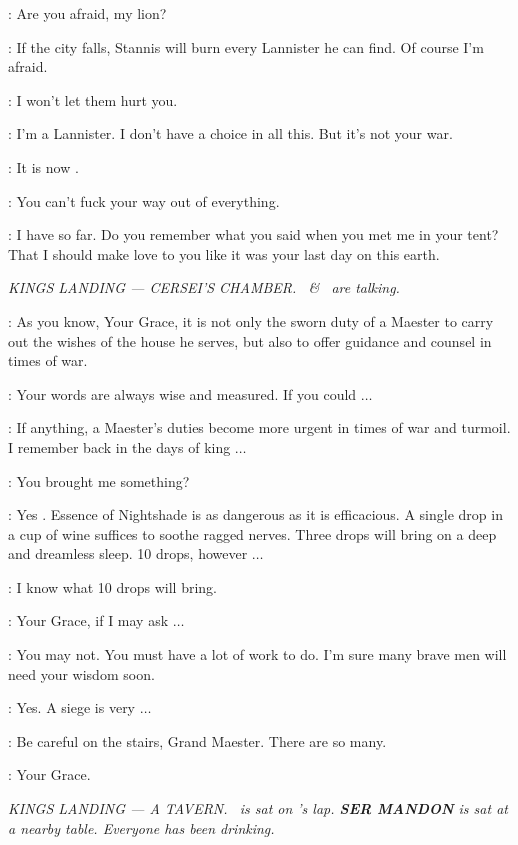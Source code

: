 \SHAE: Are you afraid, my lion? 

\TYRION: If the city falls, Stannis will burn every Lannister he can find. 
Of course I'm afraid. 

\SHAE: I won't let them hurt you. 

\TYRION: I'm a Lannister. 
I don't have a choice in all this. 
But it's not your war. 

\SHAE: It is now . 

\TYRION: You can't fuck your way out of everything. 

\SHAE: I have so far. 
Do you remember what you said when you met me in your tent? 
That I should make love to you like it was your last day on this
earth. 


\scene

\textit{KINGS LANDING --- CERSEI'S CHAMBER. \PYCELLE ~\& \CERSEI ~are talking.} 

\PYCELLE: As you know, Your Grace, it is not only the sworn duty of a Maester to carry out the wishes of the house he serves, but also to offer guidance and counsel in times of war. 

\CERSEI: Your words are always wise and measured. 
If you could $\ldots$  

\PYCELLE: If anything, a Maester's duties become more urgent in times of war and turmoil. 
I remember back in the days of king $\ldots$  

\CERSEI: You brought me something? 

\PYCELLE: Yes .
Essence of Nightshade is as dangerous as it is efficacious. 
A single drop in a cup of wine suffices to soothe ragged nerves. 
Three drops will bring on a deep and dreamless sleep. 
10 drops, however $\ldots$  

\CERSEI: I know what 10 drops will bring. 

\PYCELLE: Your Grace, if I may ask $\ldots$  

\CERSEI: You may not. 
You must have a lot of work to do. 
I'm sure many brave men will need your wisdom soon. 

\PYCELLE: Yes. A siege is very $\ldots$  

\CERSEI: Be careful on the stairs, Grand Maester. There are so many. 

\PYCELLE: Your Grace. 


\scene

\textit{KINGS LANDING --- A TAVERN. \WHORE ~is sat on \BRONN 's
lap. \textbf{SER MANDON} is sat at a nearby table. Everyone has been drinking.} 


